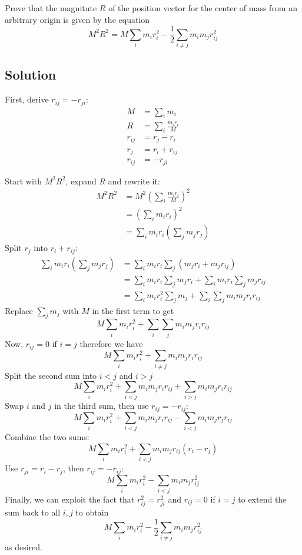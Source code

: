 Prove that the magnitute $R$ of the position vector for the center of
mass from an arbitrary origin is given by the equation
\[M^2 R^2 = M \sum_i m_i r_i^2 -
\frac{1}{2}\sum_{i\neq j} m_i m_j r_{ij}^2\]

\subsection*{Solution}
First, derive $r_{ij} = -r_{ji}$:
\begin{align*}
  M &= \sum_i m_i \\
  R &= \sum_i\frac{m_i r_i}{M} \\
  r_{ij} &= r_j - r_i \\
  r_j &= r_i + r_{ij} \\
  r_{ij} &= -r_{ji}
\end{align*}

Start with $M^2R^2$, expand $R$ and rewrite it:
\begin{align*}
  M^2R^2
  &=
  M^2\left(\sum_i\frac{m_i r_i}{M}\right)^2 \\
  &=
  \left(\sum_i m_i r_i\right)^2 \\
  &=
  \sum_i m_i r_i \left(\sum_j m_j r_j\right)
\end{align*}
Split $r_j$ into $r_i + r_{ij}$:
\begin{align*}
  \sum_i m_i r_i \left(\sum_j m_j r_j\right)
  &=
  \sum_i m_i r_i \sum_j \left(m_j r_i + m_j r_{ij}\right) \\
  &=
  \sum_i m_i r_i \sum_j m_j r_i +
  \sum_i m_i r_i \sum_j m_j r_{ij} \\
  &=
  \sum_i m_i r_i^2 \sum_j m_j +
  \sum_i \sum_j m_i m_j r_i r_{ij}
\end{align*}
Replace $\sum_j m_j$ with $M$ in the first term to get
\[M \sum_i m_i r_i^2 + \sum_i \sum_j m_i m_j r_i r_{ij}\]
Now, $r_{ij} = 0$ if $i = j$ therefore we have
\[M \sum_i m_i r_i^2 + \sum_{i\neq j} m_i m_j r_i r_{ij}\]
Split the second sum into $i < j$ and $i > j$
\[M \sum_i m_i r_i^2 +
\sum_{i<j} m_i m_j r_i r_{ij} +
\sum_{i>j} m_i m_j r_i r_{ij}\]
Swap $i$ and $j$ in the third sum, then use $ r_{ij} = - r_{ij}$:
\[M \sum_i m_i r_i^2 +
\sum_{i<j} m_i m_j r_i r_{ij} -
\sum_{i<j} m_i m_j r_j r_{ij}\]
Combine the two sums:
\[M \sum_i m_i r_i^2 +
\sum_{i<j} m_i m_j r_{ij}( r_i -  r_j)\]
Use $ r_{ji} =  r_i -  r_j$, then $ r_{ij} = - r_{ij}$:
\[M \sum_i m_i r_i^2 -
\sum_{i<j} m_i m_j r_{ij}^2\] Finally, we can exploit the fact that $
r_{ij}^2 = r_{ji}^2$ and $r_{ij} = 0$ if $i = j$ to extend the sum
back to all $i,j$ to obtain
\[M \sum_i m_i r_i^2 - \frac{1}{2}\sum_{i\neq j} m_i m_j r_{ij}^2\]
as desired.
